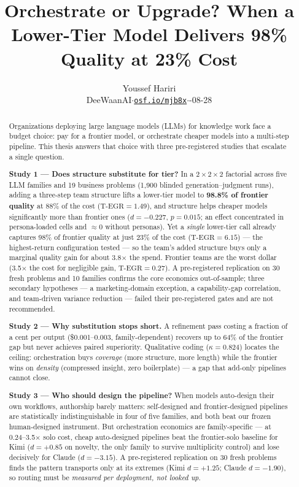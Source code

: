 \documentclass[12pt,a4paper]{article}
\title{\textbf{Orchestrate or Upgrade? When a Lower-Tier Model Delivers
98\% Quality at 23\% Cost}}
\author{Youssef Hariri\\
\small DeeWaanAI\quad $\cdot$\quad \href{https://osf.io/mjb8x}{\texttt{osf.io/mjb8x}}\quad $\cdot$\quad 2026-08-28}
\date{}
\newcommand{\TEGR}{\ensuremath{\text{T-EGR}}}
\begin{document}
\maketitle

\begin{abstract}
\noindent
Organizations deploying large language models (LLMs) for knowledge work face a
budget choice: pay for a frontier model, or orchestrate cheaper models into a
multi-step pipeline. This thesis answers that choice with three pre-registered
studies that escalate a single question.

\smallskip
\noindent\textbf{Study 1 --- Does structure substitute for tier?} In a
$2 \times 2 \times 2$ factorial across five LLM families and 19 business
problems (1{,}900 blinded generation--judgment runs), adding a three-step team
structure lifts a lower-tier model to \textbf{98.8\% of frontier quality} at
88\% of the cost ($\TEGR = 1.49$), and structure helps cheaper models
significantly more than frontier ones ($d = -0.227$, $p = 0.015$; an effect
concentrated in persona-loaded cells and $\approx 0$ without personas). Yet a
\emph{single} lower-tier call already captures 98\% of frontier quality at just
23\% of the cost ($\TEGR = 6.15$) --- the highest-return configuration tested ---
so the team's added structure buys only a marginal quality gain for about
3.8$\times$ the spend. Frontier teams are the worst dollar (3.5$\times$ the cost
for negligible gain, $\TEGR = 0.27$). A pre-registered replication on 30 fresh problems and 10 families confirms the core economics out-of-sample; three secondary hypotheses --- a marketing-domain exception, a capability-gap correlation, and team-driven variance reduction --- failed their pre-registered gates and are not recommended.

\smallskip
\noindent\textbf{Study 2 --- Why substitution stops short.} A refinement pass
costing a fraction of a cent per output (\$0.001--0.003, family-dependent)
recovers up to 64\% of the frontier gap but never achieves
paired superiority. Qualitative coding ($\kappa = 0.824$) locates the ceiling:
orchestration buys \emph{coverage} (more structure, more length) while the
frontier wins on \emph{density} (compressed insight, zero boilerplate) --- a gap
that add-only pipelines cannot close.

\smallskip
\noindent\textbf{Study 3 --- Who should design the pipeline?} When models
auto-design their own workflows, authorship barely matters: self-designed and
frontier-designed pipelines are statistically indistinguishable in four of five
families, and both beat our frozen human-designed instrument. But orchestration
economics are family-specific --- at 0.24--3.5$\times$ solo cost, cheap
auto-designed pipelines beat the frontier-solo baseline for Kimi ($d = +0.85$ on
novelty, the only family to survive multiplicity control) and lose decisively for
Claude ($d = -3.15$). A pre-registered replication on 30 fresh problems finds the
pattern transports only at its extremes (Kimi $d = +1.25$; Claude $d = -1.90$),
so routing must be \emph{measured per deployment, not looked up}.


\end{abstract}
\end{document}
